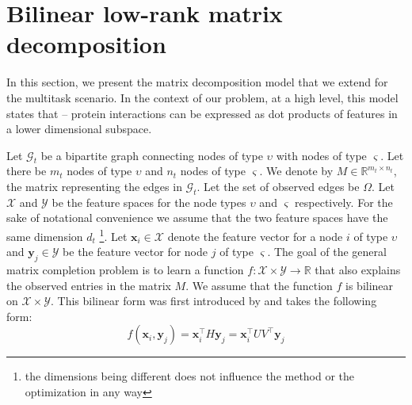 \documentclass[runningheads,a4paper]{llncs}
\begin{document}


\section{Bilinear low-rank matrix decomposition}
In this section, we present the matrix decomposition model that we extend for the multitask scenario. In the context of our problem, at a high level, this model states that -- protein interactions can be 
expressed as dot products of features in a lower dimensional subspace.

\label{MCintro}
Let $\mathcal{G}_{t}$ be a bipartite graph connecting nodes of type $\upsilon$ with nodes of type $\varsigma$. Let there be $m_t$ nodes of type $\upsilon$ and $n_t$ nodes of type $\varsigma$. We denote by $M \in \mathbb{R}^{m_t \times n_t}$, the matrix representing the edges in $\mathcal{G}_{t}$. Let the set of observed edges be $\Omega$. 
Let $\mathcal{X}$ and $\mathcal{Y}$ be the feature spaces for the node types $\upsilon$ and $\varsigma$ respectively. For the sake of notational convenience we assume that the two feature spaces have the same dimension $d_t$ \footnote{the dimensions being different does not influence the method or the optimization in any way}. Let $\mathbf{x}_i \in \mathcal{X}$ denote the feature vector for a node $i$ of type $\upsilon$ and $\mathbf{y}_j \in \mathcal{Y}$ be the feature vector for node $j$ of type $\varsigma$. The goal of the general matrix completion problem is to learn a function $f : \mathcal{X} \times \mathcal{Y} \rightarrow \mathbb{R}$ that also explains the observed entries in the matrix $M$. We assume that the function $f$ is bilinear on $\mathcal{X} \times \mathcal{Y}$. This bilinear form was first introduced by \cite{abernethy} and takes the following form:
\begin{equation}
f(\mathbf{x}_i, \mathbf{y}_j) = \mathbf{x}_i^\intercal H \mathbf{y}_j = \mathbf{x}_i^\intercal U V^\intercal \mathbf{y}_j
\end{equation}
\end{document}

